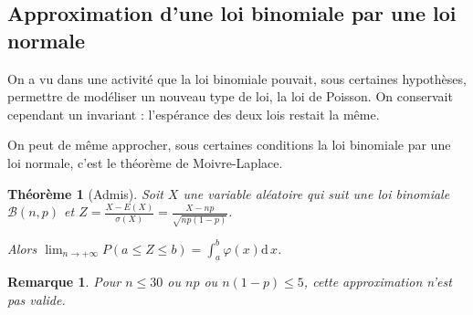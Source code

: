 \documentclass[11pt,a4paper,french]{article}
\newcommand{\diff}[1]{\mathrm{d}\,#1}
\theoremstyle{break}
\newtheorem{theoreme}{Théorème}
\theoremstyle{plain}
\theoremstyle{nonumberplain}
\newtheorem{remarque}{Remarque}
\theoremstyle{nonumberbreak}
\begin{document}
\pagebreak

\subsection{Approximation d'une loi binomiale par une loi normale}

On a vu dans une activité que la loi binomiale pouvait, sous certaines
hypothèses, permettre de modéliser un nouveau type de loi, la loi de
Poisson. On conservait cependant un invariant : l'espérance des deux
lois restait la même.

On peut de même approcher, sous certaines conditions la loi binomiale
par une loi normale, c'est le théorème de Moivre-Laplace.

\begin{theoreme}[Admis]
  Soit $X$ une variable aléatoire qui suit une loi binomiale
  $\mathcal{B}(n,p)$ et $Z = \frac{X - E(X)}{\sigma(X)} = \frac{X -
  np}{\sqrt{np(1-p)}}$.

  Alors $\lim_{n\to+\infty} P(a \leqslant Z \leqslant b) = \int_a^b
  \varphi(x) \diff x$.
\end{theoreme}

\begin{remarque}
  Pour $n \leqslant 30$ ou $np$ ou $n(1-p) \leqslant 5$, cette
  approximation n'est pas valide.
\end{remarque}
\end{document}
